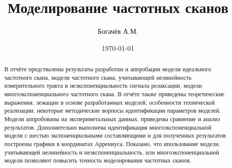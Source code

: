 \documentclass[14pt]{extarticle}
\title{Моделирование частотных сканов}
\author{Богачёв А.М.}
\date{\today}
\begin{document}
    \maketitle

    \begin{abstract}
        В отчёте предствалены результаты разработки и аппробации модели 
        идеального частотного скана, модели частотного скана, учитывающей 
        нелинейность измерительного тракта и неэкспоненциальность сигнала 
        релаксации, модели многоэкспоненциального частотного скана. В отчёте
        также приведены теоретические выражения, лежащие в основе разработанных
        моделей, особенности технической реализации, некоторые методические 
        ворпосы идентификации параметров моделей. Модели аппробованы на
        экспериметальных данных, приведены сравнение и анализ результатов. 
        Дополнительно выполнена идентификация многоэкспоненциальной модели с
        шестью экспоненциальными составляющими и для полученных результатов 
        построены графики в координатах Аррениуса. Показано, что ипользование
        модели, учитывающей нелинейность и неэкспоненциальность, или 
        многоэкспоненциальной модели позволяют повысить точность моделирования
        частотных сканов.
    \end{abstract}

    \newpage
    \tableofcontents

    

    

    

    

    

    \printbibliography[heading=bibintoc, 
                       title={Список литературы}]
\end{document}
